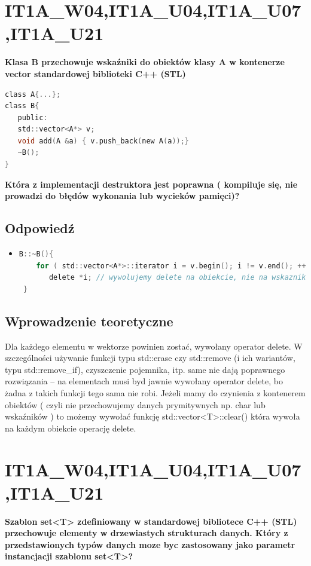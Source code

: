 \section{IT1A\_W04,IT1A\_U04,IT1A\_U07,IT1A\_U21} 
\textbf{Klasa B przechowuje wskaźniki do obiektów klasy A w kontenerze vector standardowej biblioteki C++ (STL)}
\begin{lstlisting}[language=c]
class A{...};
class B{
   public:
   std::vector<A*> v;
   void add(A &a) { v.push_back(new A(a));}
   ~B();
}
\end{lstlisting}
\textbf{Która z implementacji destruktora jest poprawna ( kompiluje się, nie prowadzi do błędów wykonania lub wycieków pamięci)?}

\subsection{Odpowiedź}
\begin{itemize}
\item 
\begin{lstlisting}[language=c]
 B::~B(){
    for ( std::vector<A*>::iterator i = v.begin(); i != v.end(); ++i )
       delete *i; // wywolujemy delete na obiekcie, nie na wskazniku do niego!
 }
\end{lstlisting}
\end{itemize}

\subsection{Wprowadzenie teoretyczne}
Dla każdego elementu w wektorze powinien zostać, wywołany operator delete. W szczególności używanie funkcji typu std::erase czy std::remove (i ich wariantów, typu std::remove\_if), czyszczenie pojemnika, itp. same nie dają poprawnego rozwiązania – na elementach musi byd jawnie wywołany operator delete, bo żadna z takich funkcji tego sama nie robi. Jeżeli mamy do czynienia z kontenerem obiektów ( czyli nie przechowujemy danych prymitywnych np. char lub wskaźników ) to możemy wywołać funkcję std::vector<T>::clear() która wywoła na każdym obiekcie operację delete.


\section{IT1A\_W04,IT1A\_U04,IT1A\_U07,IT1A\_U21}
\textbf{Szablon set<T> zdefiniowany w standardowej bibliotece C++ (STL) przechowuje elementy w drzewiastych strukturach danych. Który z przedstawionych typów danych moze byc zastosowany jako parametr instancjacji szablonu set<T>? }

